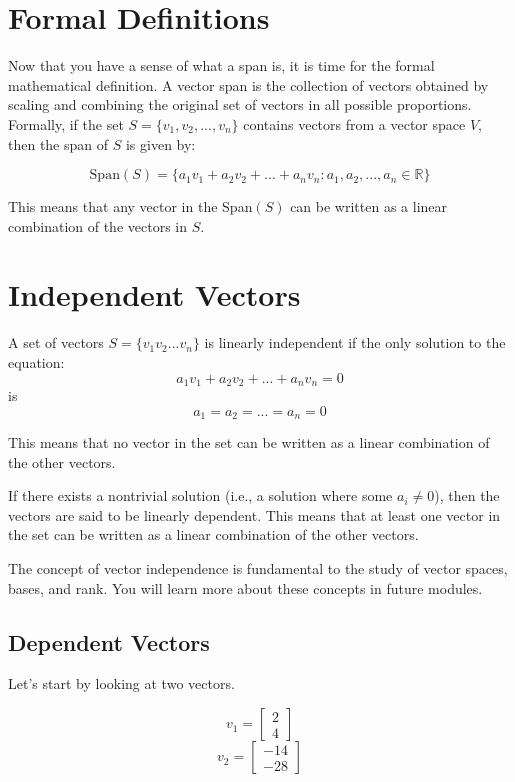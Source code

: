 \section{Formal Definitions}
Now that you have a sense of what a span is, it is time for the formal mathematical definition. A vector span is the collection of vectors obtained by scaling and combining the original set of vectors in all possible proportions.  Formally, if the set $S = \{v_1, v_2, ..., v_n\}$ contains vectors from a vector space $V$, then the span of $S$ is given by:

\begin{equation}
\text{Span}(S) = \{a_1v_1 + a_2v_2 + ... + a_nv_n : a_1, a_2, ..., a_n \in \mathbb{R}\}
\end{equation}

This means that any vector in the Span$(S)$ can be written as a linear combination of the vectors in $S$.

\section{Independent Vectors}
A set of vectors $S = \{v_1 v_2 ... v_n\}$ is  linearly independent if the only solution to the equation:
$$a_1v_1 + a_2v_2 + ... + a_nv_n = 0$$
is 
$$a_1 = a_2 = ... = a_n = 0$$ 

This means that no vector in the set can be written as a linear combination of the other vectors.

If there exists a nontrivial solution (i.e., a solution where some $a_i \neq 0$), then the vectors are said to be linearly dependent. This means that at least one vector in the set can be written as a linear combination of the other vectors.

The concept of vector independence is fundamental to the study of vector spaces, bases, and rank. You will learn more about these concepts in future modules. 

\subsection{Dependent Vectors}
Let's start by looking at two vectors. 

$$v_1 = \begin{bmatrix}
			2 \\
			4
		\end{bmatrix}$$
$$v_2 = \begin{bmatrix}
			-14 \\
			-28
\end{bmatrix}$$

